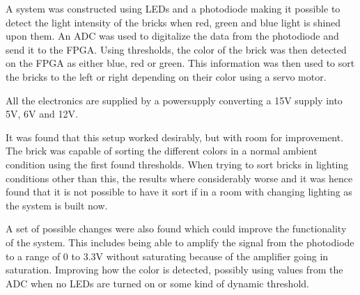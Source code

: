 A system was constructed using LEDs and a photodiode making it possible to detect the light intensity of the bricks when red, green and blue light is shined upon them.
An ADC was used to digitalize the data from the photodiode and send it to the FPGA.
Using thresholds, the color of the brick was then detected on the FPGA as either blue, red or green.
This information was then used to sort the bricks to the left or right depending on their color using a servo motor.

All the electronics are supplied by a powersupply converting a 15V supply into 5V, 6V and 12V.

It was found that this setup worked desirably, but with room for improvement.
The brick was capable of sorting the different colors in a normal ambient condition using the first found thresholds.
When trying to sort bricks in lighting conditions other than this, the results where considerably worse and it was hence found that it is not possible to have it sort if in a room with changing lighting as the system is built now.

A set of possible changes were also found which could improve the functionality of the system.
This includes being able to amplify the signal from the photodiode to a range of 0 to 3.3V without saturating because of the amplifier going in saturation.
Improving how the color is detected, possibly using values from the ADC when no LEDs are turned on or some kind of dynamic threshold.







